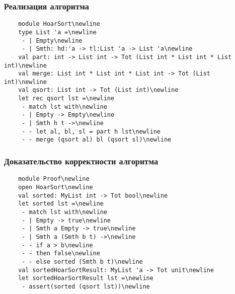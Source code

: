 \documentclass{beamer}
\begin{document}
\begin{frame}
  \transwipe[direction=90]
  \frametitle{Реализация алгоритма}
  \begin{verbatim}
    module HoarSort\newline
    type List 'a =\newline
     - | Empty\newline
     - | Smth: hd:'a -> tl:List 'a -> List 'a\newline
    val part: int -> List int -> Tot (List int * List int * List int)\newline
    val merge: List int * List int * List int -> Tot (List int)\newline
    val qsort: List int -> Tot (List int)\newline
    let rec qsort lst =\newline
     - match lst with\newline
     - | Empty -> Empty\newline
     - | Smth h t ->\newline
     - - let al, bl, sl = part h lst\newline
     - - merge (qsort al) bl (qsort sl)\newline
  \end{verbatim}
\end{frame}

\begin{frame}
  \transwipe[direction=90]
  \frametitle{Доказательство корректности алгоритма}
  \begin{verbatim}
    module Proof\newline
    open HoarSort\newline
    val sorted: MyList int -> Tot bool\newline
    let sorted lst =\newline
     - match lst with\newline
     - | Empty -> true\newline
     - | Smth a Empty -> true\newline
     - | Smth a (Smth b t) ->\newline
     - - if a > b\newline
     - - then false\newline
     - - else sorted (Smth b t)\newline
    val sortedHoarSortResult: MyList 'a -> Tot unit\newline
    let sortedHoarSortResult lst =\newline
     - assert(sorted (qsort lst))\newline
  \end{verbatim}
\end{frame}
\end{document}
